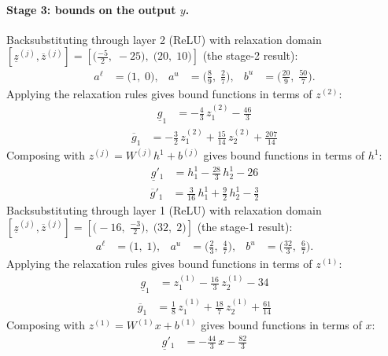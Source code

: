 \documentclass[11pt]{article}
\begin{document}
\paragraph{Stage 3: bounds on the output $y$.}
Backsubstituting through layer 2 (ReLU) with relaxation domain $[\underline{z}^{(j)}, \overline{z}^{(j)}] = [\bigl(\frac{-5}{2},\; -25\bigr),\; \bigl(20,\; 10\bigr)]$ (the stage-2 result):
\begin{align*}
a^{\ell} &= \bigl(1,\; 0\bigr), & a^{u} &= \bigl(\frac{8}{9},\; \frac{2}{7}\bigr), & b^{u} &= \bigl(\frac{20}{9},\; \frac{50}{7}\bigr).
\end{align*}
Applying the relaxation rules gives bound functions in terms of $z^{(2)}$:
\begin{align*}
\underline{g}_{1} &= -\frac{4}{3}\,z^{(2)}_{1} - \frac{46}{3}
\end{align*}
\begin{align*}
\overline{g}_{1} &= -\frac{3}{2}\,z^{(2)}_{1} + \frac{15}{14}\,z^{(2)}_{2} + \frac{207}{14}
\end{align*}
Composing with $z^{(j)} = W^{(j)} h^{1} + b^{(j)}$ gives bound functions in terms of $h^{1}$:
\begin{align*}
\underline{g}'_{1} &= h^{1}_{1} - \frac{28}{3}\,h^{1}_{2} - 26
\end{align*}
\begin{align*}
\overline{g}'_{1} &= \frac{3}{16}\,h^{1}_{1} + \frac{9}{2}\,h^{1}_{2} - \frac{3}{2}
\end{align*}
Backsubstituting through layer 1 (ReLU) with relaxation domain $[\underline{z}^{(j)}, \overline{z}^{(j)}] = [\bigl(-16,\; \frac{-3}{2}\bigr),\; \bigl(32,\; 2\bigr)]$ (the stage-1 result):
\begin{align*}
a^{\ell} &= \bigl(1,\; 1\bigr), & a^{u} &= \bigl(\frac{2}{3},\; \frac{4}{7}\bigr), & b^{u} &= \bigl(\frac{32}{3},\; \frac{6}{7}\bigr).
\end{align*}
Applying the relaxation rules gives bound functions in terms of $z^{(1)}$:
\begin{align*}
\underline{g}_{1} &= z^{(1)}_{1} - \frac{16}{3}\,z^{(1)}_{2} - 34
\end{align*}
\begin{align*}
\overline{g}_{1} &= \frac{1}{8}\,z^{(1)}_{1} + \frac{18}{7}\,z^{(1)}_{2} + \frac{61}{14}
\end{align*}
Composing with $z^{(1)} = W^{(1)} x + b^{(1)}$ gives bound functions in terms of $x$:
\begin{align*}
\underline{g}'_{1} &= -\frac{44}{3}\,x - \frac{82}{3}
\end{align*}
\end{document}

